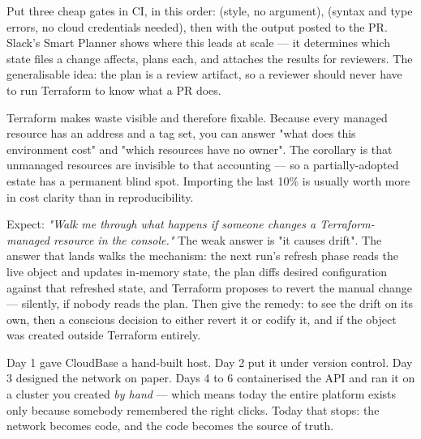 \begin{autotip}
Put three cheap gates in CI, in this order:  (style, no argument),  (syntax and type errors, no cloud credentials needed), then  with the output posted to the PR. Slack's Smart Planner shows where this leads at scale --- it determines which state files a change affects, plans each, and attaches the results for reviewers. The generalisable idea: the plan is a review artifact, so a reviewer should never have to run Terraform to know what a PR does.
\end{autotip}

\begin{costnote}
Terraform makes waste visible and therefore fixable. Because every managed resource has an address and a tag set, you can answer "what does this environment cost" and "which resources have no owner". The corollary is that unmanaged resources are invisible to that accounting --- so a partially-adopted estate has a permanent blind spot. Importing the last 10\% is usually worth more in cost clarity than in reproducibility.
\end{costnote}

\begin{interview}
Expect: \emph{"Walk me through what happens if someone changes a Terraform-managed resource in the console."} The weak answer is "it causes drift". The answer that lands walks the mechanism: the next run's refresh phase reads the live object and updates in-memory state, the plan diffs desired configuration against that refreshed state, and Terraform proposes to revert the manual change --- silently, if nobody reads the plan. Then give the remedy:  to see the drift on its own, then a conscious decision to either revert it or codify it, and  if the object was created outside Terraform entirely.
\end{interview}


Day 1 gave CloudBase a hand-built host. Day 2 put it under version control. Day 3 designed the network on paper. Days 4 to 6 containerised the API and ran it on a cluster you created \emph{by hand} --- which means today the entire platform exists only because somebody remembered the right clicks. Today that stops: the network becomes code, and the code becomes the source of truth.

